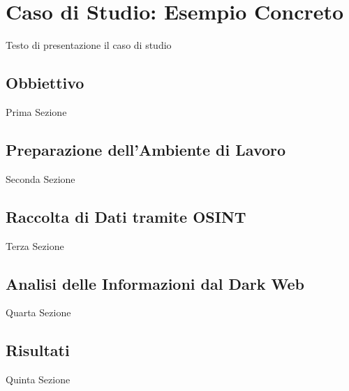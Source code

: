 \chapter{Caso di Studio: Esempio Concreto}\label{chapter:Caso_Di_Studio}

Testo di presentazione il caso di studio

\section{Obbiettivo}\label{sec:cap_sec_caso1}

Prima Sezione

\section{Preparazione dell'Ambiente di Lavoro}\label{sec:cap_sec_caso2}

Seconda Sezione

\section{Raccolta di Dati tramite OSINT}\label{sec:cap_sec_caso3}

Terza Sezione

\section{Analisi delle Informazioni dal Dark Web}\label{sec:cap_sec_caso4}

Quarta Sezione

\section{Risultati}\label{sec:cap_sec_caso5}

Quinta Sezione
